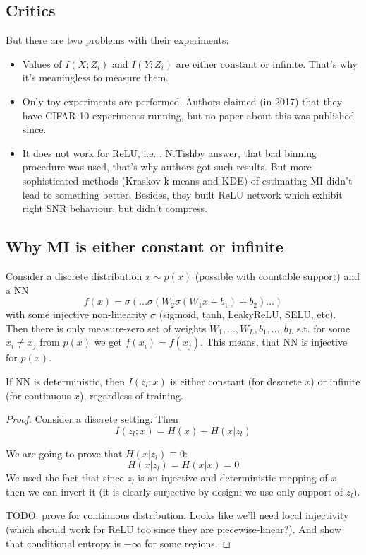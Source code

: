 \documentclass{article}
\begin{document}
\subsection{Critics}
But there are two problems with their experiments:
\begin{itemize}
    \item Values of $I(X;Z_i)$ and $I(Y;Z_i)$ are either constant or infinite. That's why it's meaningless to measure them.
    \item Only toy experiments are performed. Authors claimed (in 2017) that they have CIFAR-10 experiments running, but no paper about this was published since.
    \item It does not work for ReLU, i.e. \cite{DL_and_IB_critics}. N.Tishby answer, that bad binning procedure was used, that's why authors got such results. But more sophisticated methods (Kraskov k-means and KDE) of estimating MI didn't lead to something better. Besides, they built ReLU network which exhibit right SNR behaviour, but didn't compress. 
\end{itemize}

\subsection{Why MI is either constant or infinite}
\begin{proposition}
Consider a discrete distribution $x \sim p(x)$ (possible with countable support) and a NN
\[
f(x) = \sigma(...\sigma(W_2\sigma(W_1 x + b_1) + b_2)...)
\]
with some injective non-linearity $\sigma$ (sigmoid, tanh, LeakyReLU, SELU, etc).
Then there is only measure-zero set of weights $W_1, ..., W_L, b_1, ..., b_L$ s.t. for some $x_i \neq x_j$ from $p(x)$ we get $f(x_i) = f(x_j)$.
This means, that NN is injective for $p(x)$.
\end{proposition}

\begin{proposition}
If NN is deterministic, then $I(z_l;x)$ is either constant (for descrete $x$) or infinite (for continuous $x$), regardless of training.
\end{proposition}

\begin{proof}
Consider a discrete setting. Then
\[
I(z_l;x) = H(x) - H(x|z_l)
\]

We are going to prove that $H(x|z_l) \equiv 0$:
\[
H(x|z_l) = H(x|x) = 0
\]
We used the fact that since $z_l$ is an injective and deterministic mapping of $x$, then we can invert it (it is clearly surjective by design: we use only support of $z_l$).

TODO: prove for continuous distribution.
Looks like we'll need local injectivity (which should work for ReLU too since they are piecewise-linear?).
And show that conditional entropy is $-\infty$ for some regions.
\end{proof}
\end{document}
